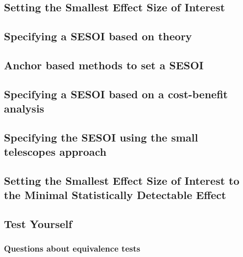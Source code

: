 \documentclass[
  oneside]{krantz}
\begin{document}
\hypertarget{sesoi}{%
\subsection{Setting the Smallest Effect Size of Interest}\label{sesoi}}

\hypertarget{specifying-a-sesoi-based-on-theory}{%
\subsection{Specifying a SESOI based on
theory}\label{specifying-a-sesoi-based-on-theory}}

\hypertarget{anchor-based-methods-to-set-a-sesoi}{%
\subsection{Anchor based methods to set a
SESOI}\label{anchor-based-methods-to-set-a-sesoi}}

\hypertarget{specifying-a-sesoi-based-on-a-cost-benefit-analysis}{%
\subsection{Specifying a SESOI based on a cost-benefit
analysis}\label{specifying-a-sesoi-based-on-a-cost-benefit-analysis}}

\hypertarget{specifying-the-sesoi-using-the-small-telescopes-approach}{%
\subsection{Specifying the SESOI using the small telescopes
approach}\label{specifying-the-sesoi-using-the-small-telescopes-approach}}

\hypertarget{setting-the-smallest-effect-size-of-interest-to-the-minimal-statistically-detectable-effect}{%
\subsection{Setting the Smallest Effect Size of Interest to the Minimal
Statistically Detectable
Effect}\label{setting-the-smallest-effect-size-of-interest-to-the-minimal-statistically-detectable-effect}}

\hypertarget{test-yourself-7}{%
\subsection{Test Yourself}\label{test-yourself-7}}

\hypertarget{questions-about-equivalence-tests}{%
\subsubsection{Questions about equivalence
tests}\label{questions-about-equivalence-tests}}
\end{document}
